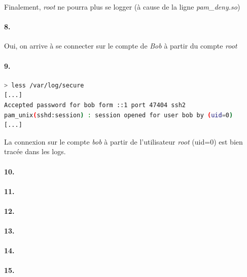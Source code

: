 \documentclass[10pt]{article}
\begin{document}
        Finalement, \textit{root} ne pourra plus se logger (à cause de la ligne \textit{pam\_deny.so})

        
        \paragraph{8.} Oui, on arrive à se connecter sur le compte de \textit{Bob} à partir du compte \textit{root}
        
        \paragraph{9.}

\begin{lstlisting}[language=bash,caption={bash version}]
> less /var/log/secure
[...]
Accepted password for bob form ::1 port 47404 ssh2
pam_unix(sshd:session) : session opened for user bob by (uid=0)
[...]
\end{lstlisting}

La connexion sur le compte \textit{bob} à partir de l'utilisateur \textit{root} (uid=0) est bien tracée dans les logs.

        \paragraph{10.}
        
        \paragraph{11.}
        
        \paragraph{12.}
        
        \paragraph{13.}
        
        \paragraph{14.}
        
        \paragraph{15.}
        
\end{document}
